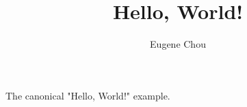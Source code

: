 \documentclass[11pt]{article}
\title{Hello, World!}
\author{Eugene Chou}
\begin{document}
  \maketitle
  The canonical "Hello, World!" example.
\end{document}
